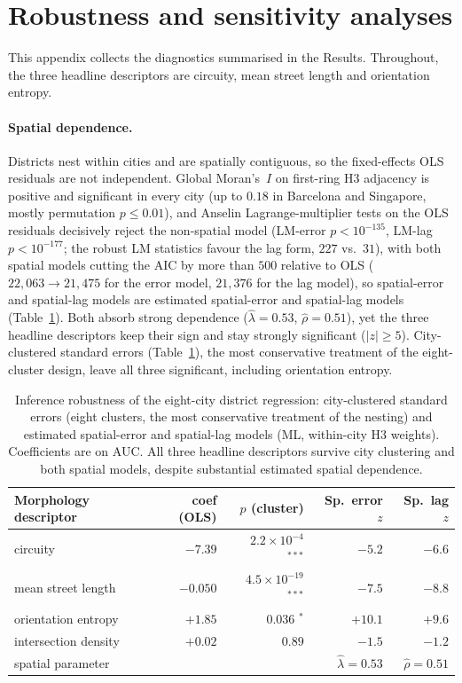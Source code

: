 \appendix
\section{Robustness and sensitivity analyses}\label{app:robust}
This appendix collects the diagnostics summarised in the Results. Throughout, the
three headline descriptors are circuity, mean street length and orientation entropy.

\paragraph{Spatial dependence.} Districts nest within cities and are spatially
contiguous, so the fixed-effects OLS residuals are not independent. Global Moran's~$I$
on first-ring H3 adjacency is positive and significant in every city (up to $0.18$ in
Barcelona and Singapore, mostly permutation $p\le0.01$), and Anselin
Lagrange-multiplier tests on the OLS residuals
decisively reject the non-spatial model (LM-error $p<10^{-135}$, LM-lag
$p<10^{-177}$; the robust LM statistics favour the lag form, $227$ vs.\ $31$), with
both spatial models cutting the AIC by more than $500$ relative to OLS
($22{,}063\to21{,}475$ for the error model, $21{,}376$ for the lag model), so
spatial-error and spatial-lag models are estimated spatial-error and spatial-lag models (Table~\ref{tab:spatial}).
Both absorb strong dependence ($\hat\lambda=0.53$, $\hat\rho=0.51$), yet the three
headline descriptors keep their sign and stay strongly significant ($|z|\ge5$).
City-clustered standard errors (Table~\ref{tab:spatial}), the most conservative
treatment of the eight-cluster design, leave all three significant, including
orientation entropy.

\begin{table}[t]\centering
\caption{Inference robustness of the eight-city district regression: city-clustered
standard errors (eight clusters, the most conservative treatment of the nesting) and
estimated spatial-error and spatial-lag models (ML, within-city H3 weights).
Coefficients are on AUC. All three headline descriptors survive city clustering and
both spatial models, despite substantial estimated spatial dependence.}
\label{tab:spatial}
\begin{tabular}{lrrrr}
\toprule
Morphology descriptor & coef (OLS) & $p$ (cluster) & Sp.\ error $z$ & Sp.\ lag $z$\\
\midrule
circuity & $-7.39$ & $2.2\times10^{-4}$ $^{***}$ & $-5.2$ & $-6.6$\\
mean street length & $-0.050$ & $4.5\times10^{-19}$ $^{***}$ & $-7.5$ & $-8.8$\\
orientation entropy & $+1.85$ & $0.036$ $^{*}$ & $+10.1$ & $+9.6$\\
intersection density & $+0.02$ & $0.89$ & $-1.5$ & $-1.2$\\
\midrule
spatial parameter & & & $\hat\lambda=0.53$ & $\hat\rho=0.51$\\
\bottomrule
\end{tabular}
\end{table}

